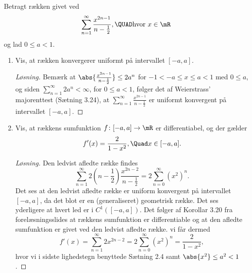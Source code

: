 \begin{opg}
	Betragt rækken givet ved
	$$ \sum_{n=1}^\infty \frac{x^{2n-1}}{n-\frac12}, \QUAD\text{hvor } x\in\mR $$
	og lad $0\leq a < 1$. 
	\begin{enumerate}
		\item Vis, at rækken konvergerer uniformt på intervallet $[-a,a]$.
		\ifanswers
		\begin{proof}[Løsning]
			Bemærk at $ \abs{\frac{x^{2n-1}}{n-\frac{1}{2}}}\leq 2a^n $ for $ -1<-a\leq x\leq a<1 $ med $ 0\leq a $, og siden $ \sum_{n=1}^{\infty}2a^n<\infty $, for $ 0\leq a<1 $, følger det af Weierstrass' majorenttest (Sætning 3.24), at $ \sum_{n=1}^\infty \frac{x^{2n-1}}{n-\frac12} $ er uniformt konvergent på intervallet $ [-a,a] $.
		\end{proof}
		\fi
		
		\item Vis, at rækkens sumfunktion $f\colon [-a,a]\to\mR$ er differentiabel, og der gælder
		$$ f'(x)=\frac{2}{1-x^2}, \Quad x\in[-a,a]. $$
		\ifanswers
		\begin{proof}[Løsning]
			Den ledvist afledte række findes\begin{equation*}
			\sum_{n=1}^{\infty}2\left(n-\frac{1}{2}\right)\frac{x^{2n-2}}{n-\frac12}=2\sum_{n=0}^{\infty}(x^2)^n.
			\end{equation*}
			Det ses at den ledvist afledte række er uniform konvergent på intervallet $ [-a,a] $, da det blot er en (generaliseret) geometrisk række. Det ses yderligere at hvert led er i $ C^1([-a,a]) $.
			Det følger af Korollar 3.20 fra forelæsningsslides at rækkens sumfunktion er differentiable og at den afledte sumfunktion er givet ved den ledvist afledte række. vi får dermed \begin{equation*}
			f'(x)=\sum_{n=1}^{\infty}2x^{2n-2}=2\sum_{n=0}^{\infty}(x^2)^n=\frac{2}{1-x^2},
			\end{equation*}
			hvor vi i sidste lighedstegn benyttede Sætning 2.4 samt $ \abs{x^2}\leq a^2<1 $.
		\end{proof}
		\fi
		

\end{enumerate}
\end{opg}
